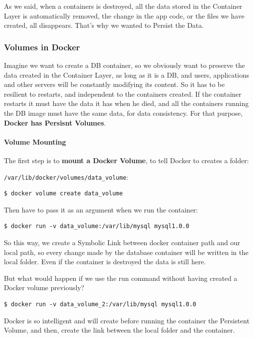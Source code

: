 \documentclass{article}
\newenvironment{blocktemplate}[1]{%
    \tcolorbox[beamer,%
    noparskip,breakable,
    colframe=Blue,%
    colbacklower=LimeGreen!75!LightGreen,%
    title=#1]}%
    {\endtcolorbox}
\newenvironment{codetemplate}[1][]{%
  \mybasecolorbox[#1]
  \itshape
}{%
  \endmybasecolorbox
}
\begin{document}
As we said, when a containers is destroyed, all the data stored in the Container Layer is automatically removed, the change in the app code, or the files we have created, all disappears. That's why we wanted to Persist the Data.

\subsubsection{Volumes in Docker}
\label{dockmount}
Imagine we want to create a DB container, so we obviously want to preserve the data created in the Container Layer, as long as it is a DB, and users, applications and other servers will be constantly modifying its content. So it has to be resilient to restarts, and independent to the containers created. If the container restarts it must have the data it has when he died, and all the containers running the DB image must have the same data, for data consistency. For that purpose, \textbf{Docker has Persisnt Volumes}.

\paragraph{Volume Mounting}

The first step is to \textbf{mount a Docker Volume}, to tell Docker to creates a folder:

\verb|/var/lib/docker/volumes/data_volume|:

\begin{codetemplate}{}
\begin{verbatim}
$ docker volume create data_volume
\end{verbatim}
\end{codetemplate}

Then have to pass it as an argument when we run the container:
\begin{codetemplate}{}
\begin{verbatim}
$ docker run -v data_volume:/var/lib/mysql mysql1.0.0
\end{verbatim}
\end{codetemplate}

So this way, we create a Symbolic Link between docker container path and our local path, so every change made by the database container will be written in the local folder. Even if the container is destroyed the data is still here.

\begin{blocktemplate}{NOTE}
But what would happen if we use the run command without having created a Docker volume previously?
\begin{codetemplate}{}
\begin{verbatim}
$ docker run -v data_volume_2:/var/lib/mysql mysql1.0.0
\end{verbatim}
\end{codetemplate}

Docker is so intelligent and will create before running the container the Persistent Volume, and then, create the link between the local folder and the container.
\end{blocktemplate}
\end{document}
